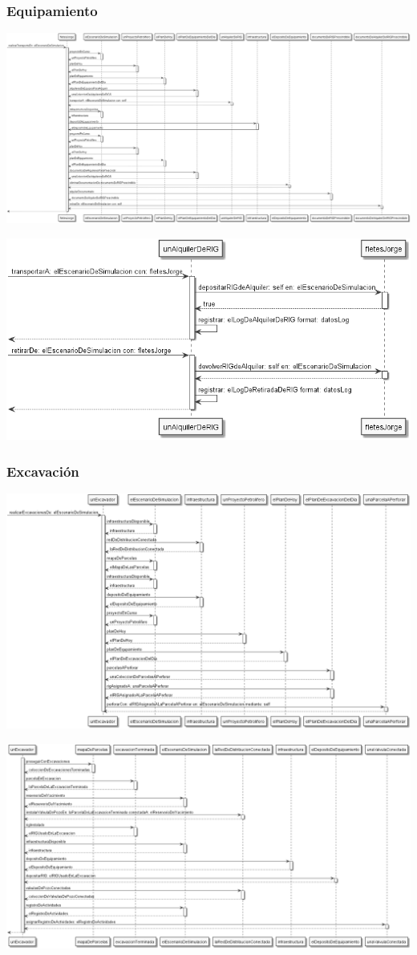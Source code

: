 \documentclass[10pt,a3paper, ,landscape]{article}
\begin{document}
\pagebreak

\subsubsection{Equipamiento}

\centerline{\includegraphics[scale=0.45]{images/secuenciaEquipamiento.png}}
\vspace{0.25cm}
\centerline{\includegraphics[scale=0.7]{images/secuenciaEquipamientoTransportar.png}}

\subsubsection{Excavación}

\centerline{\includegraphics[scale=0.45]{images/secuenciaExcavacion1.png}}
\vspace{0.25cm}
\centerline{\includegraphics[scale=0.45]{images/secuenciaExcavacion2.png}}
\end{document}
